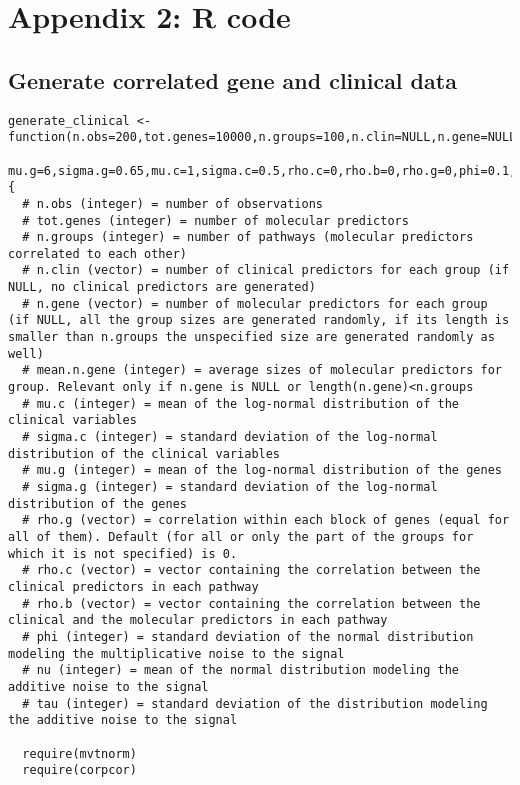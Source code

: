 \chapter{Appendix 2: R code}\label{appendix2}

\section{Generate correlated gene and clinical data}
\label{code:generate-correlated-data}
\begin{lstlisting}
generate_clinical <- function(n.obs=200,tot.genes=10000,n.groups=100,n.clin=NULL,n.gene=NULL,mean.n.gene=15,
                        mu.g=6,sigma.g=0.65,mu.c=1,sigma.c=0.5,rho.c=0,rho.b=0,rho.g=0,phi=0.1,nu=10,tau=20) {
  # n.obs (integer) = number of observations
  # tot.genes (integer) = number of molecular predictors
  # n.groups (integer) = number of pathways (molecular predictors correlated to each other)
  # n.clin (vector) = number of clinical predictors for each group (if NULL, no clinical predictors are generated)
  # n.gene (vector) = number of molecular predictors for each group (if NULL, all the group sizes are generated randomly, if its length is smaller than n.groups the unspecified size are generated randomly as well)
  # mean.n.gene (integer) = average sizes of molecular predictors for group. Relevant only if n.gene is NULL or length(n.gene)<n.groups
  # mu.c (integer) = mean of the log-normal distribution of the clinical variables
  # sigma.c (integer) = standard deviation of the log-normal distribution of the clinical variables
  # mu.g (integer) = mean of the log-normal distribution of the genes
  # sigma.g (integer) = standard deviation of the log-normal distribution of the genes
  # rho.g (vector) = correlation within each block of genes (equal for all of them). Default (for all or only the part of the groups for which it is not specified) is 0.
  # rho.c (vector) = vector containing the correlation between the clinical predictors in each pathway
  # rho.b (vector) = vector containing the correlation between the clinical and the molecular predictors in each pathway
  # phi (integer) = standard deviation of the normal distribution modeling the multiplicative noise to the signal
  # nu (integer) = mean of the normal distribution modeling the additive noise to the signal
  # tau (integer) = standard deviation of the distribution modeling the additive noise to the signal

  require(mvtnorm)
  require(corpcor)


\end{lstlisting}

